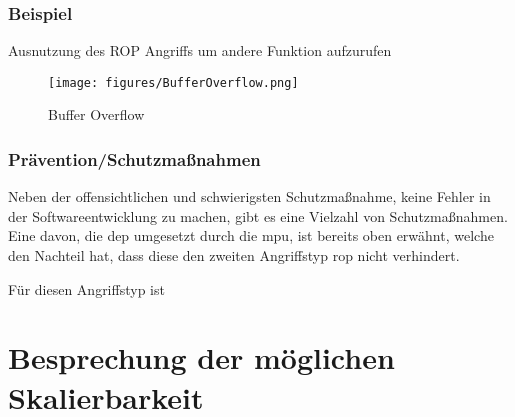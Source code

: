 \documentclass[a4paper,
DIV=13,
12pt,
BCOR=10mm,
department=FakIM,
oneside,
parskip=half,
automark,
listof=totocnumbered,
bibliography=totocnumbered,
acronym=totocnumbered
] {OTHRartcl}
\begin{document}

\subsubsection{Beispiel}
Ausnutzung des ROP Angriffs um andere Funktion aufzurufen
\begin{figure}[ht!]
  \begin{center}
    \texttt{[image: figures/BufferOverflow.png]}
    \caption{Buffer Overflow}
    \label{Abbildung 1: Buffer Overflow}
  \end{center}
\end{figure}


\subsubsection{Prävention/Schutzmaßnahmen}
Neben der offensichtlichen und schwierigsten Schutzmaßnahme, keine Fehler in der Softwareentwicklung zu machen, gibt es eine Vielzahl von Schutzmaßnahmen.
Eine davon, die \ac*{dep} umgesetzt durch die \ac*{mpu}, ist bereits oben erwähnt, welche den Nachteil hat, dass diese den zweiten Angriffstyp \ac*{rop} nicht verhindert.

Für diesen Angriffstyp ist

\newpage
\section{Besprechung der möglichen Skalierbarkeit}
\end{document}
